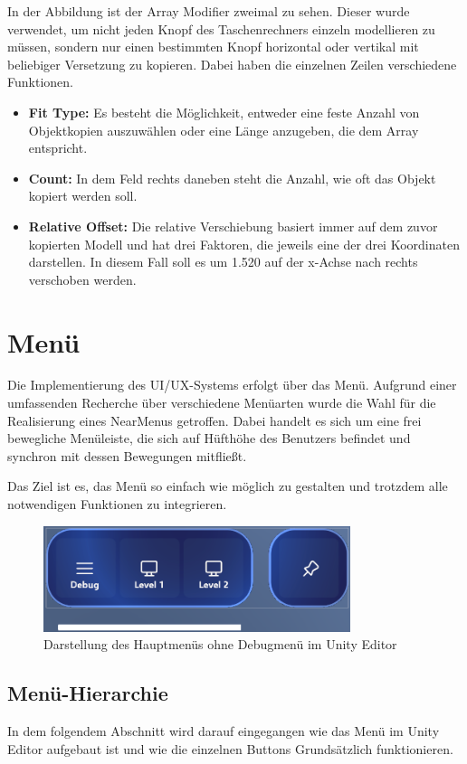 In der Abbildung ist der Array Modifier zweimal zu sehen. Dieser wurde verwendet, um nicht jeden Knopf des Taschenrechners
einzeln modellieren zu müssen, sondern nur einen bestimmten Knopf horizontal oder vertikal mit beliebiger Versetzung zu
kopieren. Dabei haben die einzelnen Zeilen verschiedene Funktionen.
\begin{itemize}
\item \textbf{Fit Type:} Es besteht die Möglichkeit, entweder eine feste Anzahl von Objektkopien auszuwählen oder eine
Länge anzugeben, die dem Array entspricht.
\item \textbf{Count:} In dem Feld rechts daneben steht die Anzahl, wie oft das Objekt kopiert werden soll.
\item \textbf{Relative Offset:} Die relative Verschiebung basiert immer auf dem zuvor kopierten Modell und hat drei
Faktoren, die jeweils eine der drei Koordinaten darstellen. In diesem Fall soll es um 1.520 auf der x-Achse nach rechts
verschoben werden.
\end{itemize}

\section{Menü}
Die Implementierung des UI/UX-Systems erfolgt über das Menü. Aufgrund einer umfassenden Recherche über verschiedene
Menüarten wurde die Wahl für die Realisierung eines NearMenus getroffen. Dabei handelt es sich um eine frei
bewegliche Menüleiste, die sich auf Hüfthöhe des Benutzers befindet und synchron mit dessen Bewegungen mitfließt.

Das Ziel ist es, das Menü so einfach wie möglich zu gestalten und trotzdem alle notwendigen Funktionen zu integrieren.
\begin{figure}[h]
\centering
\includegraphics[width=0.8\textwidth]{images/menubar.png}
\caption{Darstellung des Hauptmenüs ohne Debugmenü im Unity Editor}
\label{fig:menübar}
\end{figure}

\subsection{Menü-Hierarchie}
In dem folgendem Abschnitt wird darauf eingegangen wie das Menü im Unity Editor aufgebaut ist und wie die einzelnen
Buttons Grundsätzlich funktionieren.

